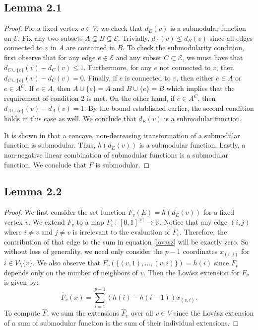 \documentclass{uwstat572}
\theoremstyle{remark}
\theoremstyle{definition}
\begin{document}
\subsection{Lemma 2.1}

\begin{proof}
For a fixed vertex $v \in V$, we check that $d_E(v)$ is a submodular function on $\mathcal{E}$.  Fix any two subsets $A \subseteq B \subseteq \mathcal{E}$.  Trivially, $d_A(v) \leq d_B(v)$ since all edges connected to $v$ in $A$ are contained in $B$.  To check the submodularity condition, first observe that for any edge $e \in \mathcal{E}$ and any subset $C \subset \mathcal{E}$, we must have that $d_{C \cup \{e\}}(v) - d_{C}(v) \leq 1$.  Furthermore, for any $e$ not connected to $v$, then $d_{C \cup \{e\}}(v) - d_{C}(v) = 0$.  Finally, if $e$ is connected to $v$, then either $e \in A$ or $e \in A^C$.  If $e \in A$, then $A \cup \{e\} = A$ and $B \cup \{e\} = B$ which implies that the requirement of condition 2 is met.  On the other hand, if $e \in A^C$, then $d_{A \cup \{e\}} (v) - d_A(v) = 1$.  By the bound established earlier, the second condition holds in this case as well.  We conclude that
$d_E(v)$ is a submodular function.

It is shown in \citep{fujishige2005submodular} that a concave, non-decreasing transformation of a submodular function is submodular.  Thus, $h(d_E(v))$ is a submodular function.  Lastly, a non-negative linear combination of submodular functions is a submodular function.  We conclude that $F$ is submodular.
\end{proof}


\subsection{Lemma 2.2}
\begin{proof}
We first consider the set function $F_v(E) = h(d_E(v))$ for a fixed vertex $v$. We extend $F_v$ to a map  $\hat{F}_v \, : \, [0,1]^{|\mathcal{E}|} \to \mathbb{R}$.  Notice that any edge $(i,j)$ where $i \neq v$ and $j \neq v$ is irrelevant to the evaluation of $F_v$. Therefore, the contribution of that edge to the sum in equation \eqref{lovasz} will be exactly zero. So without loss of generality, we need only consider the $p-1$ coordinates $x_{(v,i)}$ for $i \in V \setminus \{v\}$.  We also observe that $F_v( \{(v,1),...,(v,i)\}) = h(i)$ since $F_v$ depends only on the number of neighbors of $v$. Then the Lov{\'a}sz extension for $F_v$ is given by:
\begin{equation*}
    \hat{F}_v(x) = \sum_{i = 1}^{p-1} (h(i) - h(i-1)) x_{(v,i)}.
\end{equation*}
To compute $\hat{F}$, we sum the extensions $\hat{F}_v$ over all $v \in V$ since the Lov{\'a}sz extension of a sum of submodular function is the sum of their individual extensions.
\end{proof}
\end{document}
